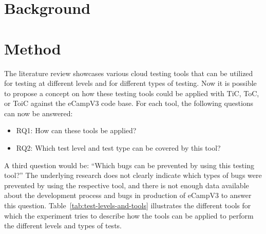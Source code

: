 \documentclass[conference]{IEEEtran}
\begin{document}
\section{Background}

\section{Method}
The literature review showcases various cloud testing tools that can be utilized for testing at different levels and for different types of testing.
Now it is possible to propose a concept on how these testing tools could be applied with TiC, ToC, or ToiC against the eCampV3 code base\cite{bertolino2019systematic}.
For each tool, the following questions can now be answered:
\begin{itemize}
	\item RQ1: How can these tools be applied?
	\item RQ2: Which test level and test type can be covered by this tool?
\end{itemize}
A third question would be: \enquote{Which bugs can be prevented by using this testing tool?}
The underlying research does not clearly indicate which types of bugs were prevented by using the respective tool, and
there is not enough data available about the development process and bugs in production of eCampV3 to answer this question.
Table~\ref{tab:test-levels-and-tools} illustrates the different tools for which the experiment tries to describe
how the tools can be applied to perform the different levels and types of tests.
\end{document}
